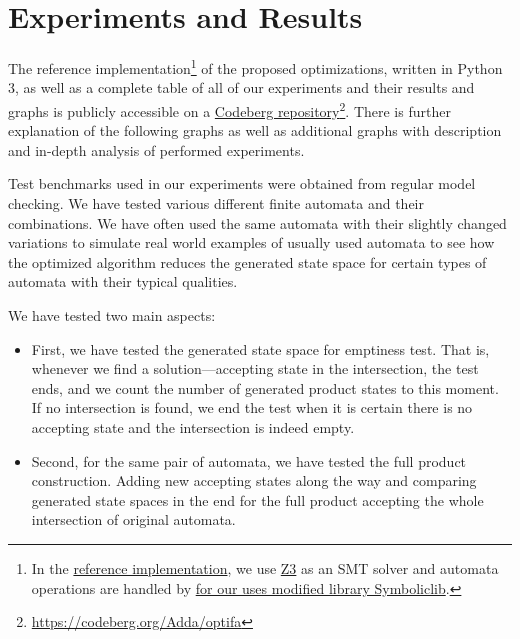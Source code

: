 

\chapter{Experiments and Results}\label{experimentsAndResultsChapter}

The reference implementation\footnote{In the \href{https://codeberg.org/Adda/optifa}{reference implementation}, we use \href{https://github.com/Z3Prover/z3}{Z3} as an SMT solver and automata operations are handled by \href{https://codeberg.org/Adda/symboliclib}{for our uses modified library Symboliclib}.} of the proposed optimizations, written in Python 3, as well as a complete table of all of our experiments and their results and graphs is publicly accessible on a \href{https://codeberg.org/Adda/optifa}{Codeberg repository}\footnote{{\href{https://codeberg.org/Adda/optifa}{https://codeberg.org/Adda/optifa}}}. There is further explanation of the following graphs as well as additional graphs with description and in-depth analysis of performed experiments.

Test benchmarks used in our experiments were obtained from regular model checking. We have tested various different finite automata and their combinations. We have often used the same automata with their slightly changed variations to simulate real world examples of usually used automata to see how the optimized algorithm reduces the generated state space for certain types of automata with their typical qualities.

We have tested two main aspects:
\begin{itemize}
    \item First, we have tested the generated state space for emptiness test. That is, whenever we find a solution---accepting state in the intersection, the test ends, and we count the number of generated product states to this moment. If no intersection is found, we end the test when it is certain there is no accepting state and the intersection is indeed empty.
    \item Second, for the same pair of automata, we have tested the full product construction. Adding new accepting states along the way and comparing generated state spaces in the end for the full product accepting the whole intersection of original automata.
\end{itemize}

